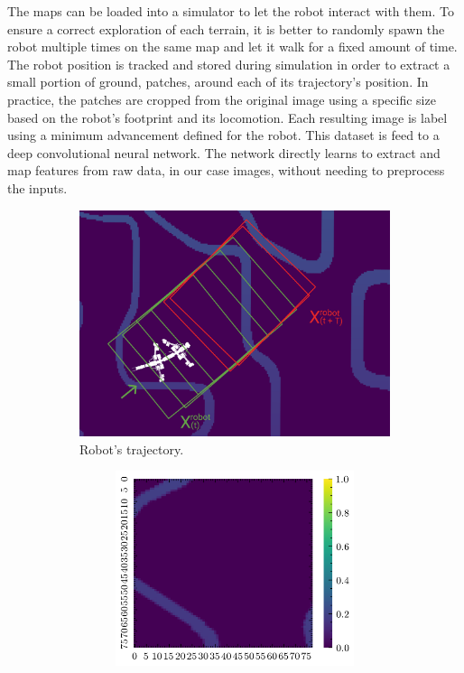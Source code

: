 \documentclass[../document.tex]{subfiles}
\begin{document}
The maps can be loaded into a simulator to let the robot interact with them. To ensure a correct exploration of each terrain, it is better to randomly spawn the robot multiple times on the same map and let it walk for a fixed amount of time. The robot position is tracked and stored during simulation in order to extract a small portion of ground, patches, around each of its trajectory's position. In practice, the patches are cropped from the original image using a specific size based on the robot's footprint and its locomotion. Each resulting image is label using a minimum advancement defined for the robot. This dataset is feed to a deep convolutional neural network. The network directly learns to extract and map features from raw data, in our case images, without needing to preprocess the inputs.
\begin{figure}[h]
    \centering
    \begin{subfigure}[b]{0.66\textwidth}
    \includegraphics[width=\textwidth]{../img/krock-bars-correct-small.png}
    \caption{Robot's trajectory.}
\end{subfigure}
\begin{subfigure}[b]{1\textwidth}
    \begin{subfigure}[b]{0.19\textwidth}
    \includegraphics[width=\linewidth]{../img/bars1-example-patches/2d/0.png}

\end{subfigure}
\end{subfigure}
\end{figure}
\end{document}
